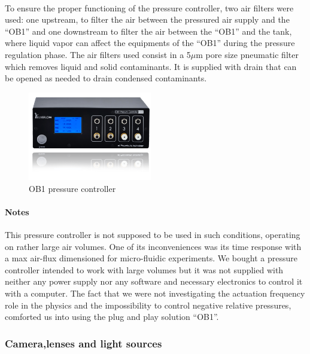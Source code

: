 \paragraph{}
To ensure the proper functioning of the pressure controller, two air filters were used: one upstream, to filter the air between the pressured air supply and the "`OB1"' and one downstream to filter the air between the "`OB1"' and the tank, where liquid vapor can affect the equipments of the "`OB1"' during the pressure regulation phase.
The air filters used consist in a 5$\mu$m pore size pneumatic filter which removes liquid and solid contaminants. It is supplied with drain that can be opened as needed to drain condensed contaminants.
\begin{figure}[H] %
	\centering%
  \includegraphics[width=0.48\textwidth]{figures/Chapter_1/OB1.png}
	\caption{OB1 pressure controller}
	\label{fig:ob1}
\end{figure}
\paragraph{Notes}
This pressure controller is not supposed to be used in such conditions, operating on rather large air volumes. One of its inconveniences was its time response with a max air-flux dimensioned for micro-fluidic experiments. We bought a pressure controller intended to work with large volumes but it was not supplied with neither any power supply nor any software and necessary electronics to control it with a computer. The fact that we were not investigating the actuation frequency role in the physics and the impossibility to control negative relative pressures, comforted us into using the plug and play solution "`OB1"'.

\subsubsection{Camera,lenses and light sources}

